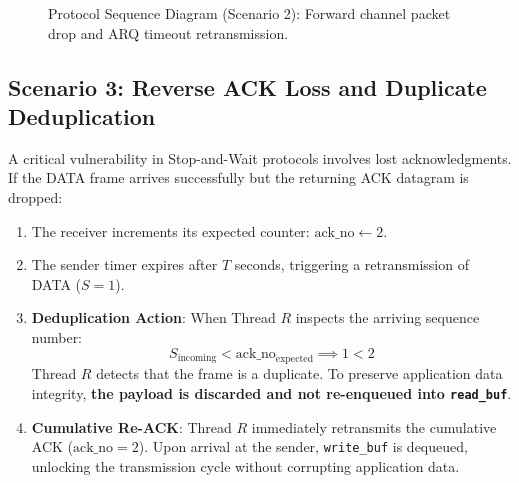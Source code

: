 \documentclass[11pt,a4paper]{article}
\begin{document}
\begin{figure}[htbp]
\caption{Protocol Sequence Diagram (Scenario 2): Forward channel packet drop and ARQ timeout retransmission.}
\label{fig:seq_drop}
\end{figure}

\subsection{Scenario 3: Reverse ACK Loss and Duplicate Deduplication}
A critical vulnerability in Stop-and-Wait protocols involves lost acknowledgments. If the DATA frame arrives successfully but the returning ACK datagram is dropped:
\begin{enumerate}
    \item The receiver increments its expected counter: $\text{ack\_no} \leftarrow 2$.
    \item The sender timer expires after $T$ seconds, triggering a retransmission of DATA ($S=1$).
    \item \textbf{Deduplication Action}: When Thread $R$ inspects the arriving sequence number:
    \begin{equation}
        S_{\text{incoming}} < \text{ack\_no}_{\text{expected}} \implies 1 < 2
    \end{equation}
    Thread $R$ detects that the frame is a duplicate. To preserve application data integrity, \textbf{the payload is discarded and not re-enqueued into \texttt{read\_buf}}.
    \item \textbf{Cumulative Re-ACK}: Thread $R$ immediately retransmits the cumulative ACK ($\text{ack\_no} = 2$). Upon arrival at the sender, \texttt{write\_buf} is dequeued, unlocking the transmission cycle without corrupting application data.
\end{enumerate}
\end{document}

